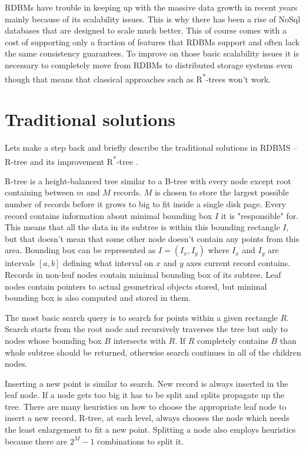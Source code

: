 \documentclass[times, utf8, diplomski]{fer}
\newcommand{\rstar}{R\textsuperscript{*}}
\begin{document}
RDBMs have trouble in keeping up with the massive data growth in recent years mainly because of its scalability issues. This is why there has been a rise of NoSql databases that are designed to scale much better. This of course comes with a cost of supporting only a fraction of features that RDBMs support and often lack the same consistency guarantees. To improve on those basic scalability issues it is necessary to completely move from RDBMs to distributed storage systems even though that means that classical approaches such as \rstar-trees won't work.

\section{Traditional solutions} \label{traditional}
Lets make a step back and briefly describe the traditional solutions in RDBMS -- R-tree \cite{rtree} and its improvement \rstar-tree \cite{rstar}.

R-tree is a height-balanced tree similar to a B-tree with every node except root containing between $m$ and $M$ records. $M$ is chosen to store the largest possible number of records before it grows to big to fit inside a single disk page. Every record contains information about minimal bounding box $I$ it is "responsible" for. This means that all the data in its subtree is within this bounding rectangle $I$, but that doesn't mean that some other node doesn't contain any points from this area. Bounding box can be represented as $I = (I_x, I_y)$ where $I_x$ and $I_y$ are intervals $[a, b]$ defining what interval on $x$ and $y$ axes current record contains. Records in non-leaf nodes contain minimal bounding box of its subtree. Leaf nodes contain pointers to actual geometrical objects stored, but minimal bounding box is also computed and stored in them.

The most basic search query is to search for points within a given rectangle $R$. Search starts from the root node and recursively traverses the tree but only to nodes whose bounding box $B$ intersects with $R$. If $R$ completely contains $B$ than whole subtree should be returned, otherwise search continues in all of the children nodes.

Inserting a new point is similar to search. New record is always inserted in the leaf node. If a node gets too big it has to be split and splits propagate up the tree. There are many heuristics on how to choose the appropriate leaf node to insert a new record. R-tree, at each level, always chooses the node which needs the least enlargement to fit a new point. Splitting a node also employs heuristics because there are $2^M-1$ combinations to split it.
\end{document}
